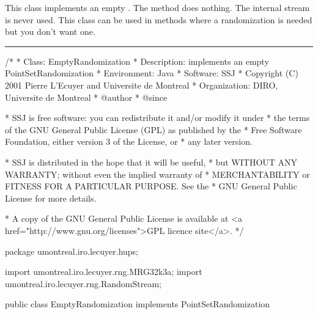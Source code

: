 
This class implements an empty
.
 The method  does nothing.
The internal stream is never used.
This class can be used in methods where a randomization is needed
but you don't want one.

\bigskip\hrule\bigskip

\begin{code}
\begin{hide}
/*
 * Class:        EmptyRandomization
 * Description:  implements an empty PointSetRandomization
 * Environment:  Java
 * Software:     SSJ 
 * Copyright (C) 2001  Pierre L'Ecuyer and Universite de Montreal
 * Organization: DIRO, Universite de Montreal
 * @author       
 * @since

 * SSJ is free software: you can redistribute it and/or modify it under
 * the terms of the GNU General Public License (GPL) as published by the
 * Free Software Foundation, either version 3 of the License, or
 * any later version.

 * SSJ is distributed in the hope that it will be useful,
 * but WITHOUT ANY WARRANTY; without even the implied warranty of
 * MERCHANTABILITY or FITNESS FOR A PARTICULAR PURPOSE.  See the
 * GNU General Public License for more details.

 * A copy of the GNU General Public License is available at
   <a href="http://www.gnu.org/licenses">GPL licence site</a>.
 */
\end{hide}
package umontreal.iro.lecuyer.hups;
\begin{hide}
 import umontreal.iro.lecuyer.rng.MRG32k3a;
 import umontreal.iro.lecuyer.rng.RandomStream;

\end{hide}
public class EmptyRandomization implements PointSetRandomization\begin{hide} {
   protected RandomStream stream = new MRG32k3a();
\end{hide}
\end{code}

